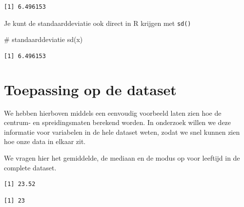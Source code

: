 \documentclass[
  letterpaper,
  DIV=11,
  numbers=noendperiod]{scrreprt}
\newenvironment{Shaded}{\begin{snugshade}}{\end{snugshade}}
\newcommand{\CommentTok}[1]{\textcolor[rgb]{0.37,0.37,0.37}{#1}}
\newcommand{\FunctionTok}[1]{\textcolor[rgb]{0.28,0.35,0.67}{#1}}
\newcommand{\NormalTok}[1]{\textcolor[rgb]{0.00,0.23,0.31}{#1}}
\newcommand{\SpecialCharTok}[1]{\textcolor[rgb]{0.37,0.37,0.37}{#1}}
\begin{document}
\begin{verbatim}
[1] 6.496153
\end{verbatim}

Je kunt de standaarddeviatie ook direct in R krijgen met \texttt{sd()}

\begin{Shaded}
\begin{Highlighting}[]
\CommentTok{\# standaarddeviatie}
\FunctionTok{sd}\NormalTok{(x)}
\end{Highlighting}
\end{Shaded}

\begin{verbatim}
[1] 6.496153
\end{verbatim}

\section{Toepassing op de dataset}\label{toepassing-op-de-dataset}

We hebben hierboven middels een eenvoudig voorbeeld laten zien hoe de
centrum- en spreidingsmaten berekend worden. In onderzoek willen we deze
informatie voor variabelen in de hele dataset weten, zodat we snel
kunnen zien hoe onze data in elkaar zit.

We vragen hier het gemiddelde, de mediaan en de modus op voor leeftijd
in de complete dataset.

\begin{Shaded}
\end{Shaded}

\begin{verbatim}
[1] 23.52
\end{verbatim}

\begin{Shaded}
\end{Shaded}

\begin{verbatim}
[1] 23
\end{verbatim}
\end{document}
